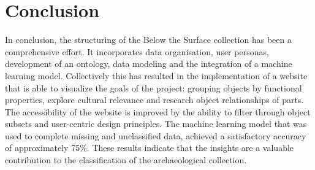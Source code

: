 \section{Conclusion}

In conclusion, the structuring of the Below the Surface collection has been a comprehensive effort. It incorporates data organisation, user personas, development of an ontology, data modeling and the integration of a machine learning model. Collectively this has resulted in the implementation of a website that is able to visualize the goals of the project: grouping objects by functional properties, explore cultural relevance and research object relationships of parts. The accessibility of the website is improved by the ability to filter through object subsets and user-centric design principles. The machine learning model that was used to complete missing and unclassified data, achieved a satisfactory accuracy of approximately 75\%. These results indicate that the insights are a valuable contribution to the classification of the archaeological collection.